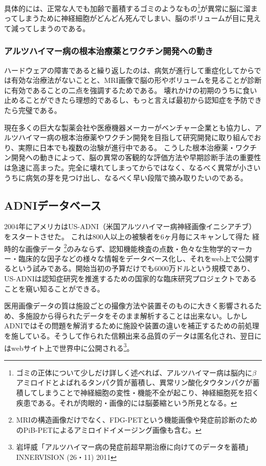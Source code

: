 具体的には、正常な人でも加齢で蓄積するゴミのようなもの\footnote{ゴミの正体について少しだけ詳しく述べれば、アルツハイマー病は脳内に$\beta$アミロイドとよばれるタンパク質が蓄積し、異常リン酸化タウタンパクが蓄積してしまうことで神経細胞の変性・機能不全が起こり、神経細胞死を招く疾患である。それが肉眼的・画像的には脳萎縮という所見となる。}が異常に脳に溜まってしまうために神経細胞がどんどん死んでしまい、脳のボリュームが目に見えて減ってしまうのである。

\subsubsection{アルツハイマー病の根本治療薬とワクチン開発への動き}
ハードウェアの障害であると繰り返したのは、病気が進行して重症化してからでは有効な治療法がないことと、MRI画像で脳の形やボリュームを見ることが診断に有効であることの二点を強調するためである。
壊れかけの初期のうちに食い止めることができたら理想的であるし、もっと言えば最初から認知症を予防できたら完璧である。

現在多くの巨大な製薬会社や医療機器メーカーがベンチャー企業とも協力し、アルツハイマー病の根本治療薬やワクチン開発を目指して研究開発に取り組んでおり、実際に日本でも複数の治験が進行中である。
こうした根本治療薬・ワクチン開発への動きによって、脳の異常の客観的な評価方法や早期診断手法の重要性は急速に高まった。完全に壊れてしまってからではなく、なるべく異常が小さいうちに病気の芽を見つけ出し、なるべく早い段階で摘み取りたいのである。
\subsection{ADNIデータベース}
2004年にアメリカはUS-ADNI（米国アルツハイマー病神経画像イニシアチブ）をスタートさせた。
これは800人以上の被験者を6ヶ月毎にスキャンして得た
経時的な画像データ
\footnote{
MRIの構造画像だけでなく、FDG-PETという機能画像や発症前診断のためのPiB-PETによるアミロイドイメージング画像も含む。}のみならず、認知機能検査の点数・色々な生物学的マーカー・臨床的な因子などの様々な情報をデータベース化し、それをweb上で公開するという試みである。開始当初の予算だけでも6000万ドルという規模であり、US-ADNIは認知症研究を推進するための国家的な臨床研究プロジェクトであることを窺い知ることができる。

医用画像データの質は施設ごとの撮像方法や装置そのものに大きく影響されるため、多施設から得られたデータをそのまま解析することは出来ない。しかしADNIではその問題を解消するために施設や装置の違いを補正するための前処理を施している。そうして作られた信頼出来る品質のデータは匿名化され、翌日にはwebサイト上で世界中に公開される\footnote{岩坪威「アルツハイマー病の発症前超早期治療に向けてのデータを蓄積」INNERVISION (26・11) 2011}。

